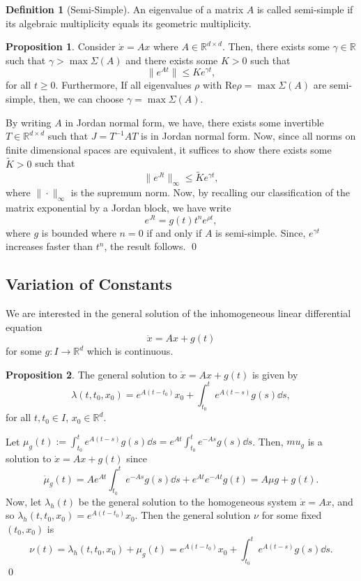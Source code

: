 \documentclass[
]{article}
\theoremstyle{definition}
\newtheorem{prop}{Proposition}
\theoremstyle{definition}
\newtheorem{definition}{Definition}[section]
\begin{document}
\begin{definition}[Semi-Simple]
  An eigenvalue of a matrix \(A\) is called semi-simple if its algebraic multiplicity 
  equals its geometric multiplicity.
\end{definition}
\begin{prop}
  Consider \(\dot x = A x\) where \(A \in \mathbb{R}^{d \times d}\). Then, there 
  exists some \(\gamma \in \mathbb{R}\) such that \(\gamma > \max \Sigma(A)\) and
  there exists some \(K > 0\) such that 
  \[\|e^{At}\| \le Ke^{\gamma t},\]
  for all \(t \ge 0\). Furthermore, If all 
  eigenvalues \(\rho\) with \(\text{Re} \rho = \max \Sigma(A)\) are semi-simple, 
  then, we can choose \(\gamma = \max \Sigma(A)\). 
\end{prop}
\proof

By writing \(A\) in Jordan normal form, we have, there exists some
invertible \(T \in \mathbb{R}^{d \times d}\) such that \(J = T^{-1}A T\)
is in Jordan normal form. Now, since all norms on finite dimensional
spaces are equivalent, it suffices to show there exists some
\(\tilde K > 0\) such that
\[\|e^{Jt}\|_\infty \le \tilde K e^{\gamma t},\] where
\(\|\cdot\|_\infty\) is the supremum norm. Now, by recalling our
classification of the matrix exponential by a Jordan block, we have
write \[e^{J t} = g(t)t^n e^{\rho t},\] where \(g\) is bounded where
\(n = 0\) if and only if \(A\) is semi-simple. Since, \(e^{\gamma t}\)
increases faster than \(t^n\), the result follows. \qed

\hypertarget{variation-of-constants}{%
\subsection{Variation of Constants}\label{variation-of-constants}}

We are interested in the general solution of the inhomogeneous linear
differential equation \[\dot x = A x + g(t)\] for some
\(g : I \to \mathbb{R}^d\) which is continuous.

\begin{prop}
  The general solution to \(\dot x = A x + g(t)\) is given by 
  \[\lambda(t, t_0, x_0) = e^{A(t - t_0)}x_0 + \int_{t_0}^t e^{A(t - s)}g(s) \dd s,\]
  for all \(t, t_0 \in I\), \(x_0 \in \mathbb{R}^d\).
\end{prop}
\proof

Let
\(\mu_g(t) := \int_{t_0}^t e^{A(t - s)}g(s) \dd s = e^{At} \int_{t_0}^t e^{-As}g(s) \dd s\).
Then, \(mu_g\) is a solution to \(\dot x = A x + g(t)\) since
\[\dot \mu_g(t) = Ae^{At} \int_{t_0}^t e^{-As} g(s) \dd s + e^{At} e^{-At} g(t) 
    = A \mu g + g(t).\] Now, let \(\lambda_h(t)\) be the general
solution to the homogeneous system \(\dot x = A x\), and so
\(\lambda_h(t, t_0, x_0) = e^{A(t - t_0)}x_0\). Then the general
solution \(\nu\) for some fixed \((t_0, x_0)\) is
\[\nu(t) = \lambda_h (t, t_0, x_0) + \mu_g(t) 
    = e^{A(t - t_0)}x_0 + \int_{t_0}^t e^{A(t - s)}g(s) \dd s.\] \qed
\end{document}
